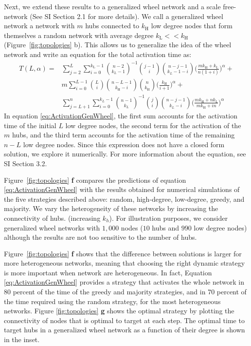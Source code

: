 \documentclass[preprint,superscriptaddress,floatfix]{article}
\begin{document}
Next, we extend these results to a generalized wheel network and a scale free-network (See SI Section 2.1 for more details). We call a generalized wheel network a network with $m$ hubs connected to $k_\text{H}$ low degree nodes that form themselves a random network with average degree $k_\text{L} << k_\text{H}$ (Figure~\ref{fig:topologies} b). This allows us to generalize the idea of the wheel network and write an equation for the total activation time as: 
\begin{equation}
    \label{eq:ActivationGenWheel}
    \begin{split}
        T(L,\alpha) = 
                    & \sum_{j=2}^{L}\sum_{i=0}^{k_\text{L}-1} \binom{n -2}{k_L-1}^{-1}\binom{j-1}{i} \binom{n -j-1}{k_L-1-i} \bigg(\frac{m k_\text{H}+k_\text{L}}{n(1+i)}\bigg)^{\alpha} +\\
                    & m\sum_{i=0}^{L-1}\binom{L}{i} \binom{n-L-1}{k_\text{H}-i} \binom{n}{k_\text{H}} \bigg(\frac{k_\text{H}}{i+1}\bigg)^{\alpha} +\\
                    & \sum_{j=L+1}^{n}\sum_{i=0}^{k_L-1}\binom{n-1}{k_L}^{-1} \binom{j}{i}\binom{n-j-1}{k_L-i}\bigg(\frac{mk_\text{H}+nk_\text{L}}{mk_\text{H}+in}\bigg)^{\alpha}
\end{split}
\end{equation}
In equation \ref{eq:ActivationGenWheel}, the first sum accounts for the activation time of the initial $L$ low degree nodes, the second term for the activation of the $m$ hubs, and the third term accounts for the activation time of the remaining $n-L$ low degree nodes. Since this expression does not have a closed form solution, we explore it numerically. For more information about the equation, see SI Section 3.2.

Figure~\ref{fig:topologies} \textbf{f} compares the predictions of equation \ref{eq:ActivationGenWheel} with the results obtained for numerical simulations of the five strategies described above: random, high-degree, low-degree, greedy, and majority. We vary the heterogeneity of these networks by increasing the connectivity of hubs. (increasing $k_h$). For illustration purposes, we consider generalized wheel networks with $1,000$ nodes  ($10$ hubs and $990$ low degree nodes) although the results are not too sensitive to the number of hubs.

Figure~\ref{fig:topologies} \textbf{f} shows that the difference between solutions is larger for more heterogeneous networks, meaning that choosing the right dynamic strategy is more important when network are heterogeneous. In fact, Equation \ref{eq:ActivationGenWheel} provides a strategy that activates the whole network in 80 percent of the time of the greedy and majority strategies, and in 70 percent of the time required using the random strategy, for the most heterogeneous networks. Figure \ref{fig:topologies} \textbf{g} shows the optimal strategy by plotting the connectivity of nodes that is optimal to target at each step. The optimal time to target hubs in a generalized wheel network as a function of their degree is shown in the inset. 
\end{document}
